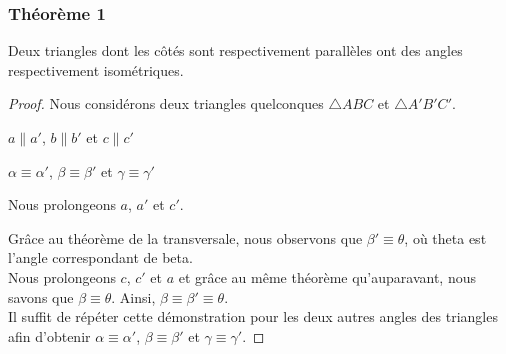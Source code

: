 \documentclass[a4paper,12pt]{article}
\begin{document}
\subsubsection{Théorème 1}
\begin{theorem}
Deux triangles dont les côtés sont respectivement parallèles ont des angles respectivement isométriques.
\end{theorem}

\begin{proof}
Nous considérons deux triangles quelconques $\triangle ABC$ et $\triangle A'B'C'$.


\begin{hyp}
$a \parallel a'$, $b \parallel b'$ et $c \parallel c'$
\end{hyp}
\begin{concl}
$\alpha \equiv \alpha'$, $\beta \equiv \beta'$ et $\gamma \equiv \gamma'$
\end{concl}

Nous prolongeons $a$, $a'$ et $c'$. 


Grâce au théorème de la transversale, nous observons que $\beta' \equiv \theta$, où theta est l'angle correspondant de beta.\\
Nous prolongeons $c$, $c'$ et $a$ et grâce au même théorème qu'auparavant, nous savons que $\beta \equiv \theta$.
Ainsi, $\beta \equiv \beta' \equiv \theta$.\\
Il suffit de répéter cette démonstration pour les deux autres angles des triangles afin d'obtenir $\alpha \equiv \alpha'$, $\beta \equiv \beta'$ et $\gamma \equiv \gamma'$.


\end{proof}
\end{document}
